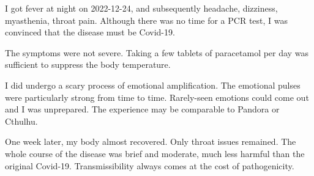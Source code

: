 
I got fever at night on 2022-12-24, and subsequently headache, dizziness, myasthenia, throat pain.
Although there was no time for a PCR test, I was convinced that the disease must be Covid-19.

The symptoms were not severe. Taking a few tablets of paracetamol per day was sufficient to suppress the body temperature.

I did undergo a scary process of emotional amplification.
The emotional pulses were particularly strong from time to time.
Rarely-seen emotions could come out and I was unprepared.
The experience may be comparable to Pandora or Cthulhu.

One week later, my body almost recovered. Only throat issues remained.
The whole course of the disease was brief and moderate, much less harmful than the original Covid-19.
Transmissibility always comes at the cost of pathogenicity.
